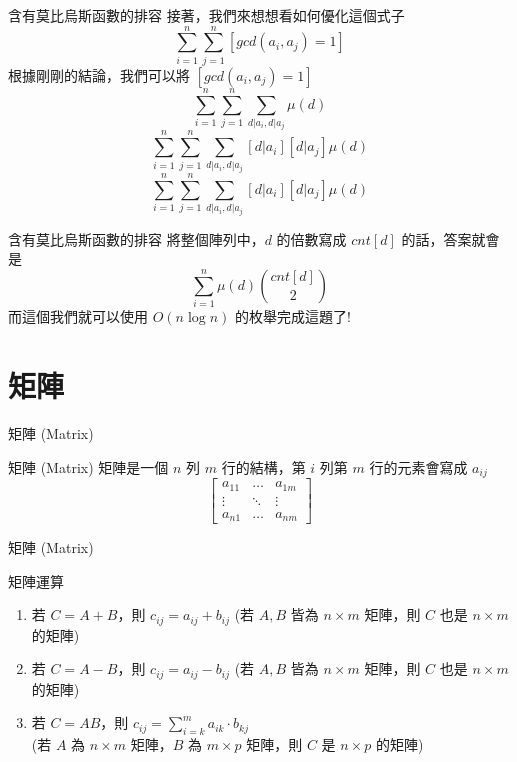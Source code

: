\documentclass[aspectratio=169]{beamer}
\begin{document}
\begin{frame}{含有莫比烏斯函數的排容}
    接著，我們來想想看如何優化這個式子
        $$\sum_{i=1}^n \sum_{j=1}^n [gcd(a_i,a_j)=1]$$
    根據剛剛的結論，我們可以將 $[gcd(a_i,a_j)=1]$
        $$\sum_{i=1}^n \sum_{j=1}^n \sum_{d|a_i, d|a_j} \mu(d)$$
        $$\sum_{i=1}^n \sum_{j=1}^n \sum_{d|a_i, d|a_j}[d|a_i][d|a_j] \mu(d)$$
        $$\sum_{i=1}^n \sum_{j=1}^n \sum_{d|a_i, d|a_j}[d|a_i][d|a_j] \mu(d)$$
\end{frame}

\begin{frame}{含有莫比烏斯函數的排容}
    將整個陣列中，$d$ 的倍數寫成 $cnt[d]$ 的話，答案就會是
        $$\sum_{i=1}^n \mu(d) \binom{cnt[d]}{2}$$
    而這個我們就可以使用 $O(n \log n)$ 的枚舉完成這題了!
\end{frame}

\section{矩陣}

\begin{frame}{矩陣 (Matrix)}
    \begin{alertblock}{矩陣 (Matrix)}
        矩陣是一個 $n$ 列 $m$ 行的結構，第 $i$ 列第 $m$ 行的元素會寫成 $a_{ij}$
        $$\begin{bmatrix}a_{11} & \dots & a_{1m} \\ \vdots & \ddots & \vdots \\ a_{n1} & \dots & a_{nm}\end{bmatrix}$$
    \end{alertblock}
\end{frame}

\begin{frame}{矩陣 (Matrix)}
    \begin{alertblock}{矩陣運算}
        \begin{enumerate}
            \item 若 $C = A + B$，則 $c_{ij} = a_{ij} + b_{ij}$ (若 $A,B$ 皆為 $n \times m$ 矩陣，則 $C$ 也是 $n \times m$ 的矩陣)
            \item 若 $C = A - B$，則 $c_{ij} = a_{ij} - b_{ij}$ (若 $A,B$ 皆為 $n \times m$ 矩陣，則 $C$ 也是 $n \times m$ 的矩陣)
            \item 若 $C = AB$，則 $\displaystyle c_{ij} = \sum_{i=k}^m {a_{ik} \cdot b_{kj}}$ \\ (若 $A$ 為 $n \times m$ 矩陣，$B$ 為 $m \times p$ 矩陣，則 $C$ 是 $n \times p$ 的矩陣)
        \end{enumerate}
    \end{alertblock}
\end{frame}
\end{document}
